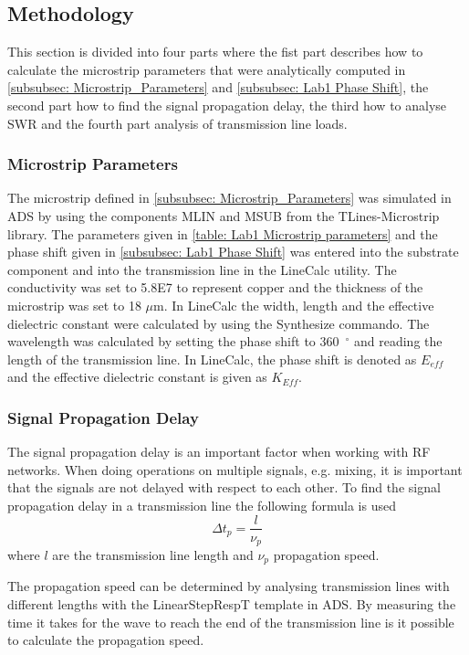 \documentclass[report.tex]{subfiles}
\begin{document}
\subsection{Methodology}\label{sec:Lab1 methodology}
This section is divided into four parts where the fist part describes how to calculate the microstrip parameters that were analytically computed in \ref{subsubsec: Microstrip_Parameters} and \ref{subsubsec: Lab1 Phase Shift}, the second part how to find the signal propagation delay, the third how to analyse SWR and the fourth part analysis of transmission line loads.

\subsubsection{Microstrip Parameters}
The microstrip defined in \ref{subsubsec: Microstrip_Parameters} was simulated in ADS by using the components MLIN and MSUB from the TLines-Microstrip library. The parameters given in \ref{table: Lab1 Microstrip parameters} and the phase shift given in \ref{subsubsec: Lab1 Phase Shift} was entered into the substrate component and into the transmission line in the LineCalc utility. The conductivity was set to 5.8E7 to represent copper and the thickness of the microstrip was set to 18 $\mu$m. In LineCalc the width, length and the effective dielectric constant were calculated by using the Synthesize commando. The wavelength was calculated by setting the phase shift to 360~$^\circ$ and reading the length of the transmission line. In LineCalc, the phase shift is denoted as $E_{eff}$ and the effective dielectric constant is given as $K_{Eff}$.

\subsubsection{Signal Propagation Delay}
The signal propagation delay is an important factor when working with RF networks. When doing operations on multiple signals, e.g. mixing, it is important that the signals are not delayed with respect to each other. To find the signal propagation delay in a transmission line the following formula is used
\begin{equation}\label{eq: Lab1 propagation delay}
	\Delta t_p = \dfrac{l}{\nu_p}
\end{equation}
where $l$ are the transmission line length and $\nu_p$ propagation speed.

The propagation speed can be determined by analysing transmission lines with different lengths with the LinearStepRespT template in ADS. By measuring the time it takes for the wave to reach the end of the transmission line is it possible to calculate the propagation speed.
\end{document}
